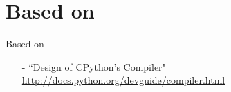 \section{Based on}
\begin{frame}{Based on}
\begin{itemize}
    \item[-] ``Design of CPython's Compiler" \url{http://docs.python.org/devguide/compiler.html}
\end{itemize}
\end{frame}